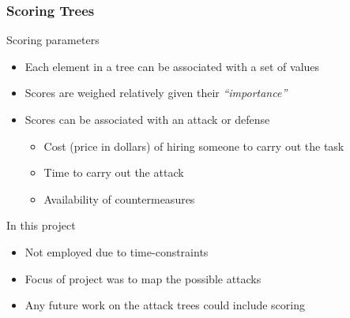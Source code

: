 \begin{frame}\frametitle{Scoring Trees}
  \begin{block}{Scoring parameters}
    \begin{itemize}
      \item Each element in a tree can be associated with a set of values
      \item Scores are weighed relatively given their \emph{``importance''}
      \item Scores can be associated with an attack or defense
      \begin{itemize}
        \item Cost (price in dollars) of hiring someone to carry out the task
        \item Time to carry out the attack
        \item Availability of countermeasures
      \end{itemize}
    \end{itemize}
  \end{block}
  \begin{block}{In this project}
    \begin{itemize}
      \item Not employed due to time-constraints
      \item Focus of project was to map the possible attacks
      \item Any future work on the attack trees could include scoring
    \end{itemize}
  \end{block}
\end{frame}
